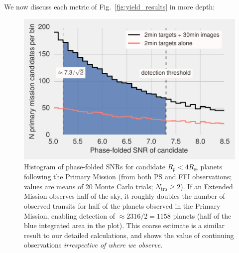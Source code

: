We now discuss each metric of Fig.~\ref{fig:yield_results} in more depth:
	\begin{figure}[!t]
		\centering
		\includegraphics[scale=1.]{figures/snrf_histogram_with_ps.pdf}
		\caption{Histogram of phase-folded SNRs for candidate $R_p<4R_\oplus$ 
			planets following the Primary Mission (from both PS and FFI 
			observations; values are means of 20 Monte Carlo trials; 
			$N_\mathrm{tra}\geq2$).
			If an Extended Mission observes half of the sky, it roughly doubles 
			the number of observed transits for half of the planets observed in 
			the Primary Mission, enabling detection of $\approx 2316/2 = 1158$ 
			planets (half of the blue integrated area in the plot). This coarse 
			estimate is a similar result to our detailed calculations, and 
			shows the value of continuing \tesss observations 
			\textit{irrespective of where we observe}.}
		\label{fig:snrf_histogram}
	\end{figure}
